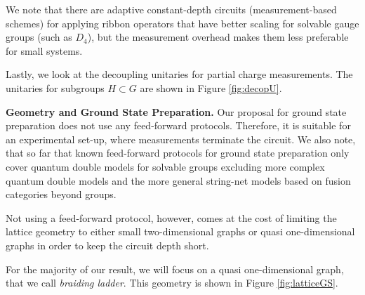 \documentclass[two column]{article}
\begin{document}
We note that there are adaptive constant-depth circuits (measurement-based schemes) for applying ribbon operators that have better scaling for solvable gauge groups\cite{bravyi2022adaptive} (such as $D_4$), but the measurement overhead makes them less preferable for small systems. 

Lastly, we look at the decoupling unitaries for partial charge measurements. The unitaries for subgroups $H\subset G$ are shown in Figure \ref{fig:decopU}. 


\textbf{Geometry and Ground State Preparation.}
Our proposal for ground state preparation does not use any feed-forward protocols. Therefore, it is suitable for an experimental set-up, where measurements terminate the circuit. We also note, that so far that known feed-forward protocols for ground state preparation only cover quantum double models for solvable groups excluding more complex quantum double models and the more general string-net models based on fusion categories beyond groups.

Not using a feed-forward protocol, however, comes at the cost of limiting the lattice geometry to either small two-dimensional graphs or quasi one-dimensional graphs in order to keep the circuit depth short.

For the majority of our result, we will focus on a quasi one-dimensional graph, that we call \emph{braiding ladder}. 
This geometry is shown in Figure \ref{fig:latticeGS}. 
\end{document}
